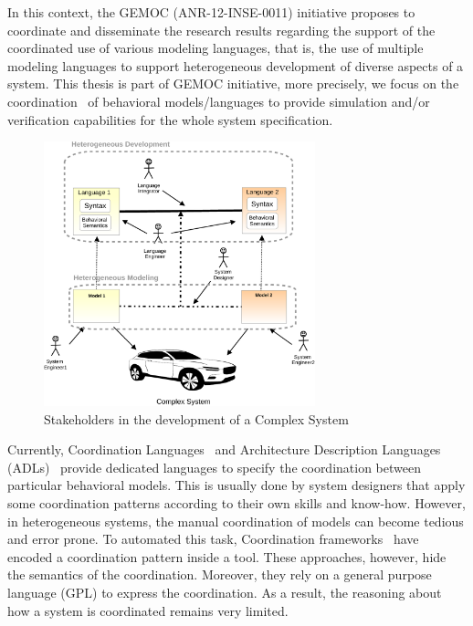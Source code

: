 In this context, the GEMOC (ANR-12-INSE-0011) initiative proposes to coordinate and disseminate the research results regarding the support of the coordinated use of various modeling languages, that is, the use of multiple modeling languages to support heterogeneous development of diverse aspects of a system. This thesis is part of GEMOC initiative, more precisely, we focus on the coordination~\cite{coordsignibib} of behavioral models/languages to provide simulation and/or verification capabilities for the whole system specification. 


\begin{figure}
	\begin{center}
		\includegraphics[width=0.7\textwidth]{introduction/stakeholders.pdf}
		\caption{Stakeholders in the development of a Complex System}
		\label{fig:stackeholders}
	\end{center}
\end{figure}
	
Currently, Coordination Languages~\cite{coordsignibib} and Architecture Description Languages (ADLs)~\cite{frameadlsbib} provide dedicated languages to specify the coordination between particular behavioral models. This is usually done by system designers that apply some coordination patterns according to their own skills and know-how. However, in heterogeneous systems, the manual coordination of models can become tedious and error prone. To automated this task, Coordination frameworks~\cite{ptoleframebib,modhelxbib} have encoded a coordination pattern inside a tool. These approaches, however, hide the semantics of the coordination. Moreover, they rely on a general purpose language (GPL) to express the coordination. As a result, the reasoning about how a system is coordinated remains very limited.  
	
